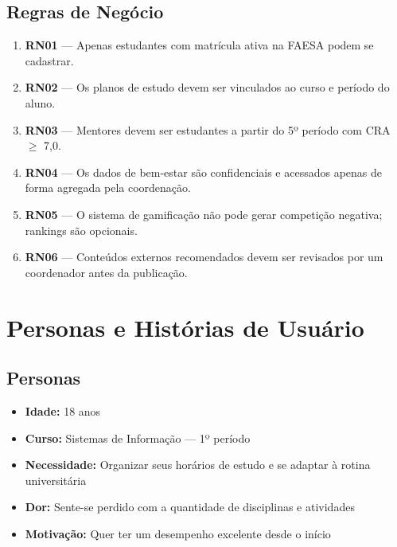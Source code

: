 \documentclass[12pt, a4paper]{article}
\begin{document}
\subsection{Regras de Negócio}

\begin{alerta}
\begin{enumerate}
    \item \textbf{RN01} --- Apenas estudantes com matrícula ativa na FAESA podem se cadastrar.
    \item \textbf{RN02} --- Os planos de estudo devem ser vinculados ao curso e período do aluno.
    \item \textbf{RN03} --- Mentores devem ser estudantes a partir do 5º período com CRA $\geq$ 7,0.
    \item \textbf{RN04} --- Os dados de bem-estar são confidenciais e acessados apenas de forma agregada pela coordenação.
    \item \textbf{RN05} --- O sistema de gamificação não pode gerar competição negativa; rankings são opcionais.
    \item \textbf{RN06} --- Conteúdos externos recomendados devem ser revisados por um coordenador antes da publicação.
\end{enumerate}
\end{alerta}

\newpage
\section{Personas e Histórias de Usuário}

\subsection{Personas}

\begin{destaque}
\begin{itemize}
    \item \textbf{Idade:} 18 anos
    \item \textbf{Curso:} Sistemas de Informação --- 1º período
    \item \textbf{Necessidade:} Organizar seus horários de estudo e se adaptar à rotina universitária
    \item \textbf{Dor:} Sente-se perdido com a quantidade de disciplinas e atividades
    \item \textbf{Motivação:} Quer ter um desempenho excelente desde o início
\end{itemize}
\end{destaque}
\end{document}
